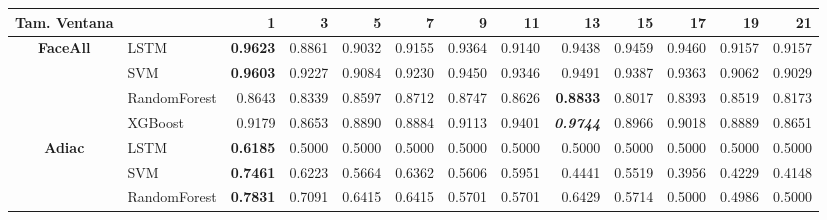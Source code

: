 \begin{table}[H]
	\centering
	\begin{adjustbox}{max width=14cm}
		\begin{tabular}{|c|l|r|r|r|r|r|r|r|r|r|r|r|}
			\hline
			\textbf{Tam. Ventana} &              & 1                        & 3                        & 5               & 7                        & 9               & 11     & 13              & 15                       & 17                       & 19              & 21              \\
			\hline
			\textbf{FaceAll}      & LSTM         & \textbf{0.9623} & 0.8861                   & 0.9032          & 0.9155                   & 0.9364          & 0.9140 & 0.9438          & 0.9459                   & 0.9460                   & 0.9157          & 0.9157          \\
			                      & SVM          & \textbf{0.9603}          & 0.9227                   & 0.9084          & 0.9230                   & 0.9450          & 0.9346 & 0.9491          & 0.9387                   & 0.9363                   & 0.9062          & 0.9029          \\
			                      & RandomForest & 0.8643                   & 0.8339                   & 0.8597          & 0.8712                   & 0.8747          & 0.8626 & \textbf{0.8833} & 0.8017                   & 0.8393                   & 0.8519          & 0.8173          \\
			                      & XGBoost      & 0.9179                   & 0.8653                   & 0.8890          & 0.8884                   & 0.9113          & 0.9401 & \textit{\textbf{0.9744}} & 0.8966                   & 0.9018                   & 0.8889          & 0.8651          \\
			\hline
			\textbf{Adiac}        & LSTM         & \textbf{0.6185}          & 0.5000                   & 0.5000          & 0.5000                   & 0.5000          & 0.5000 & 0.5000          & 0.5000                   & 0.5000                   & 0.5000          & 0.5000          \\
			                      & SVM          & \textbf{0.7461}          & 0.6223                   & 0.5664          & 0.6362                   & 0.5606          & 0.5951 & 0.4441          & 0.5519                   & 0.3956                   & 0.4229          & 0.4148          \\
			                      & RandomForest & \textbf{0.7831}          & 0.7091                   & 0.6415          & 0.6415                   & 0.5701          & 0.5701 & 0.6429          & 0.5714                   & 0.5000                   & 0.4986          & 0.5000          \\

\end{tabular}
\end{adjustbox}
\end{table}
